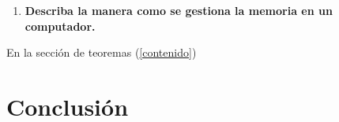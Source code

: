 \documentclass{article}
\begin{document}
\begin{enumerate}
\begin{enumerate}
    \end{enumerate}
    \item \textbf{Describa la manera como se gestiona la memoria en un computador.}\\
    
    
\end{enumerate}

En la sección de teoremas (\ref{contenido})

\section{Conclusión} \label{conclulsion}



\end{document}
